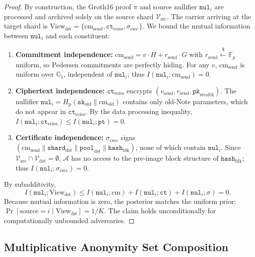 \documentclass[sigconf,nonacm]{acmart}
\begin{document}
\begin{proof}
By construction, the Groth16 proof $\pi$ and source nullifier $\mathtt{nul}_i$ are processed and archived solely on the source shard $\mathcal{V}_{\text{src}}$. The carrier arriving at the target shard is $\text{View}_{\text{dst}} = \{ \text{cm}_{\text{send}}, \mathtt{ct}_{\text{ecies}}, \sigma_{\text{cscc}} \}$. We bound the mutual information between $\mathtt{nul}_i$ and each constituent:
\begin{enumerate}
    \item \textbf{Commitment independence:} $\text{cm}_{\text{send}} = v \cdot H + r_{\text{send}} \cdot G$ with $r_{\text{send}} \xleftarrow{\$} \mathbb{F}_p$ uniform, so Pedersen commitments are perfectly hiding. For any $v$, $\text{cm}_{\text{send}}$ is uniform over $\mathbb{G}_1$, independent of $\mathtt{nul}_i$; thus $I(\mathtt{nul}_i; \text{cm}_{\text{send}}) = 0$.
    \item \textbf{Ciphertext independence:} $\mathtt{ct}_{\text{ecies}}$ encrypts $(v_{\text{send}}, r_{\text{send}}, \mathtt{pk}_{\text{stealth}})$. The nullifier $\mathtt{nul}_i = H_{\text{p}}(\mathtt{sk}_{\text{old}} \parallel \text{cm}_{\text{old}})$ contains only old-Note parameters, which do not appear in $\mathtt{ct}_{\text{ecies}}$. By the data processing inequality, $I(\mathtt{nul}_i; \mathtt{ct}_{\text{ecies}}) \le I(\mathtt{nul}_i; \mathtt{pt}) = 0$.
    \item \textbf{Certificate independence:} $\sigma_{\text{cscc}}$ signs $(\text{cm}_{\text{send}} \parallel \mathtt{shard}_{\text{dst}} \parallel \mathtt{pool}_{\text{dst}} \parallel \mathtt{hash}_{\text{blk}})$, none of which contain $\mathtt{nul}_i$. Since $\mathcal{V}_{\text{src}} \cap \mathcal{V}_{\text{dst}} = \emptyset$, $\mathcal{A}$ has no access to the pre-image block structure of $\mathtt{hash}_{\text{blk}}$; thus $I(\mathtt{nul}_i; \sigma_{\text{cscc}}) = 0$.
\end{enumerate}
By subadditivity,
\begin{equation}
I(\mathtt{nul}_i; \text{View}_{\text{dst}}) \le I(\mathtt{nul}_i; \text{cm}) + I(\mathtt{nul}_i; \mathtt{ct}) + I(\mathtt{nul}_i; \sigma) = 0.
\end{equation}
Because mutual information is zero, the posterior matches the uniform prior: $\Pr[\text{source} = i \mid \text{View}_{\text{dst}}] = 1/K$. The claim holds unconditionally for computationally unbounded adversaries.
\end{proof}

\subsection{Multiplicative Anonymity Set Composition}
\end{document}
